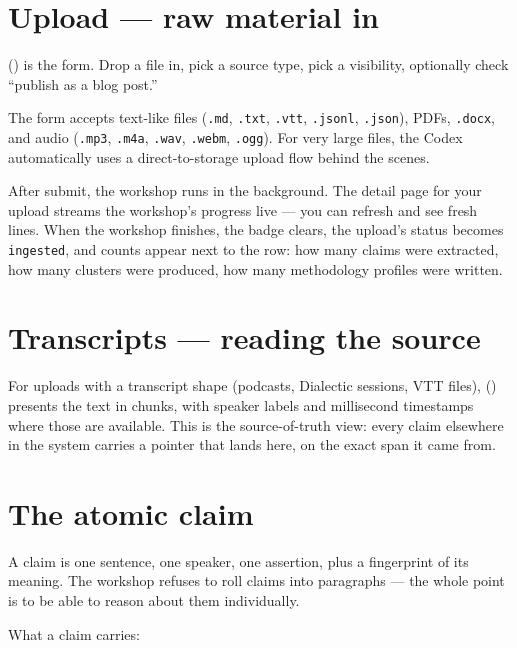 \documentclass[11pt]{article}
\begin{document}
\section{Upload --- raw material in}

 () is the form. Drop a file in, pick a
source type, pick a visibility, optionally check ``publish as a blog
post.''

The form accepts text-like files (\texttt{.md}, \texttt{.txt},
\texttt{.vtt}, \texttt{.jsonl}, \texttt{.json}), PDFs, \texttt{.docx},
and audio (\texttt{.mp3}, \texttt{.m4a}, \texttt{.wav}, \texttt{.webm},
\texttt{.ogg}). For very large files, the Codex automatically uses a
direct-to-storage upload flow behind the scenes.

After submit, the workshop runs in the background. The detail page for
your upload streams the workshop's progress live --- you can refresh
and see fresh lines. When the workshop finishes, the badge clears, the
upload's status becomes \texttt{ingested}, and counts appear next to
the row: how many claims were extracted, how many clusters were
produced, how many methodology profiles were written.


\section{Transcripts --- reading the source}

For uploads with a transcript shape (podcasts, Dialectic sessions, VTT
files),  () presents
the text in chunks, with speaker labels and millisecond timestamps
where those are available. This is the source-of-truth view: every
claim elsewhere in the system carries a pointer that lands here, on
the exact span it came from.

\section{The atomic claim}

A claim is one sentence, one speaker, one assertion, plus a fingerprint
of its meaning. The workshop refuses to roll claims into paragraphs ---
the whole point is to be able to reason about them individually.

What a claim carries:
\end{document}
